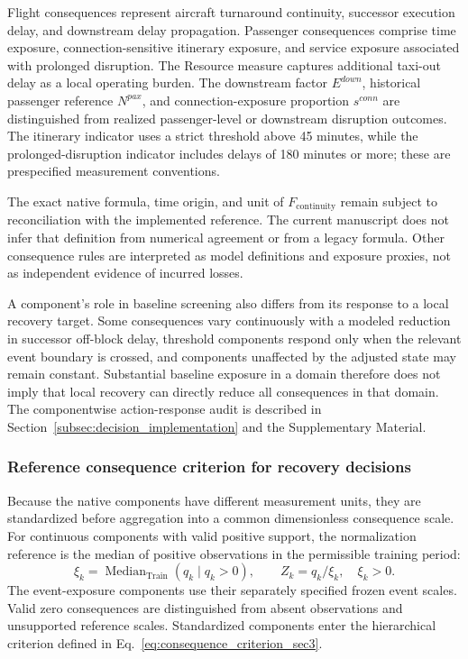 Flight consequences represent aircraft turnaround continuity, successor execution delay, and downstream delay propagation. Passenger consequences comprise time exposure, connection-sensitive itinerary exposure, and service exposure associated with prolonged disruption. The Resource measure captures additional taxi-out delay as a local operating burden. The downstream factor $E^{down}$, historical passenger reference $N^{pax}$, and connection-exposure proportion $s^{conn}$ are distinguished from realized passenger-level or downstream disruption outcomes. The itinerary indicator uses a strict threshold above 45 minutes, while the prolonged-disruption indicator includes delays of 180 minutes or more; these are prespecified measurement conventions.

The exact native formula, time origin, and unit of $F_{\mathrm{continuity}}$ remain subject to reconciliation with the implemented reference. The current manuscript does not infer that definition from numerical agreement or from a legacy formula. Other consequence rules are interpreted as model definitions and exposure proxies, not as independent evidence of incurred losses.

A component's role in baseline screening also differs from its response to a local recovery target. Some consequences vary continuously with a modeled reduction in successor off-block delay, threshold components respond only when the relevant event boundary is crossed, and components unaffected by the adjusted state may remain constant. Substantial baseline exposure in a domain therefore does not imply that local recovery can directly reduce all consequences in that domain. The componentwise action-response audit is described in Section~\ref{subsec:decision_implementation} and the Supplementary Material.

\subsubsection{Reference consequence criterion for recovery decisions}

Because the native components have different measurement units, they are standardized before aggregation into a common dimensionless consequence scale. For continuous components with valid positive support, the normalization reference is the median of positive observations in the permissible training period:
\[
\xi_k=\operatorname{Median}_{\mathrm{Train}}(q_k\mid q_k>0),
\qquad Z_k=q_k/\xi_k,\quad \xi_k>0.
\]
The event-exposure components use their separately specified frozen event scales. Valid zero consequences are distinguished from absent observations and unsupported reference scales. Standardized components enter the hierarchical criterion defined in Eq.~\eqref{eq:consequence_criterion_sec3}.

